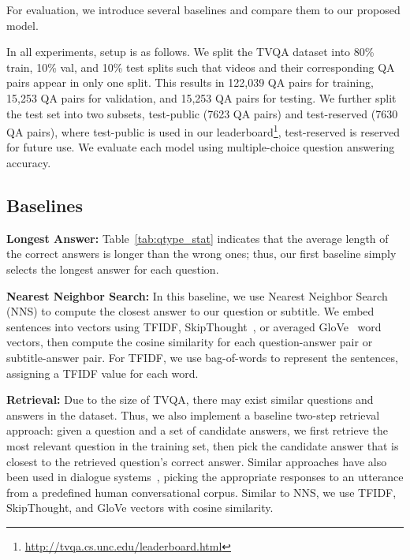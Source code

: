 \documentclass[11pt,a4paper]{article}
\begin{document}
For evaluation, we introduce several baselines and compare them to our proposed model.  

In all experiments, setup is as follows.
We split the TVQA dataset into 80\% train, 10\% val, and 10\% test splits such that videos and their corresponding QA pairs appear in only one split. This results in 122,039 QA pairs for training, 15,253 QA pairs for validation, and 15,253 QA pairs for testing. We further split the test set into two subsets, test-public (7623 QA pairs) and test-reserved (7630 QA pairs), where test-public is used in our leaderboard\footnote{\url{http://tvqa.cs.unc.edu/leaderboard.html}}, test-reserved is reserved for future use. We evaluate each model using multiple-choice question answering accuracy.


\subsection{Baselines}

\noindent\textbf{Longest Answer:} Table~\ref{tab:qtype_stat} indicates that the average length of the correct answers is longer than the wrong ones; thus, our first baseline simply selects the longest answer for each question.


\noindent\textbf{Nearest Neighbor Search:} 
In this baseline, we use Nearest Neighbor Search (NNS) to compute the closest answer to our question or subtitle.
We embed sentences into vectors using TFIDF, SkipThought~\cite{Kiros2015SkipThoughtV}, or averaged GloVe~\citep{Pennington2014GloveGV} word vectors, then compute the cosine similarity for each question-answer pair or subtitle-answer pair.
For TFIDF, we use bag-of-words to represent the sentences, assigning a TFIDF value for each word.

\noindent\textbf{Retrieval:} 
Due to the size of TVQA, there may exist similar questions and answers in the dataset. Thus, we also implement a baseline two-step retrieval approach: 
given a question and a set of candidate answers, we first retrieve the most relevant question in the training set, then pick the candidate answer that is closest to the retrieved question's correct answer. 
Similar approaches have also been used in dialogue systems~\citep{Jafarpour2010FilterRA, Leuski2011NPCEditorCV}, picking the appropriate responses to an utterance from a predefined human conversational corpus. 
Similar to NNS, we use TFIDF, SkipThought, and GloVe vectors with cosine similarity.
\end{document}
